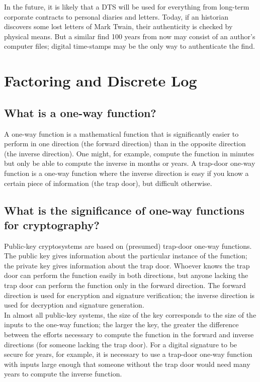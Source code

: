 In the future, it is likely that a DTS will be used for everything from
long-term corporate contracts to personal diaries and letters. Today,
if an historian discovers some lost letters of Mark Twain, their
authenticity is checked by physical means. But a similar find 100 years
from now may consist of an author's computer files; digital time-stamps
may be the only way to authenticate the find.


\section{Factoring and Discrete Log}

\subsection{What is a one-way function?}

A one-way function is a mathematical function that is significantly
easier to perform in one direction (the forward direction) than in the
opposite direction (the inverse direction). One might, for example,
compute the function in minutes but only be able to compute the inverse
in months or years. A trap-door one-way function is a one-way function
where the inverse direction is easy if you know a certain piece of
information (the trap door), but difficult otherwise.

\subsection{What is the significance of one-way functions for
cryptography?}

Public-key cryptosystems are based on (presumed) trap-door one-way
functions. The public key gives information about the particular
instance of the function; the private key gives information about the
trap door. Whoever knows the trap door can perform the function easily
in both directions, but anyone lacking the trap door can perform the
function only in the forward direction. The forward direction is used
for encryption and signature verification; the inverse direction is
used for decryption and signature generation.\\

In almost all public-key systems, the size of the key corresponds to
the size of the inputs to the one-way function; the larger the key, the
greater the difference between the efforts necessary to compute the
function in the forward and inverse directions (for someone lacking the
trap door). For a digital signature to be secure for years, for
example, it is necessary to use a trap-door one-way function with
inputs large enough that someone without the trap door would need many
years to compute the inverse function.\\

